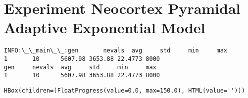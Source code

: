 \documentclass[11pt]{article}
\begin{document}
    \hypertarget{experiment-neocortex-pyramidal-adaptive-exponential-model}{%
\section{Experiment Neocortex Pyramidal Adaptive Exponential
Model}\label{experiment-neocortex-pyramidal-adaptive-exponential-model}}

    \begin{Verbatim}[commandchars=\\\{\}]
INFO:\_\_main\_\_:gen       nevals  avg     std     min     max
1       10      5607.98 3653.88 22.4773 8000
gen     nevals  avg     std     min     max
1       10      5607.98 3653.88 22.4773 8000
    \end{Verbatim}

    
    \begin{verbatim}
HBox(children=(FloatProgress(value=0.0, max=150.0), HTML(value='')))
    \end{verbatim}
\end{document}
